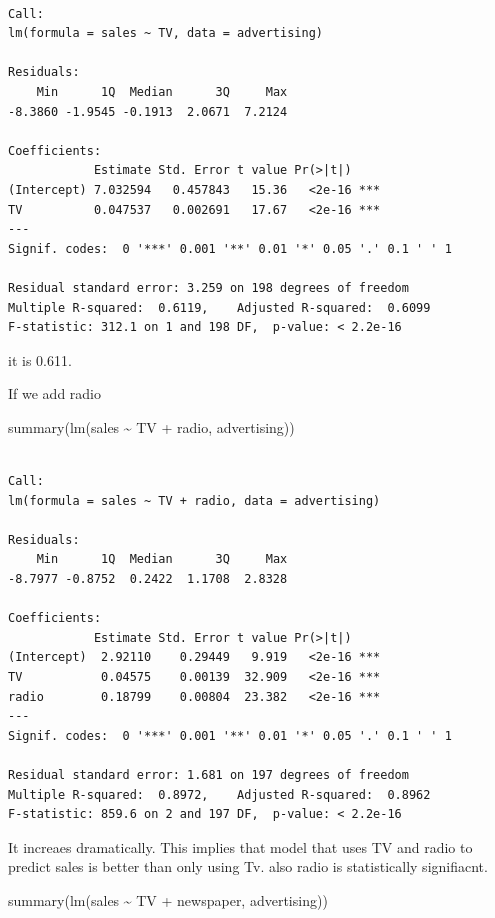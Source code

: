 \documentclass[
  letterpaper,
  DIV=11,
  numbers=noendperiod]{scrreprt}
\newenvironment{Shaded}{\begin{snugshade}}{\end{snugshade}}
\newcommand{\FunctionTok}[1]{\textcolor[rgb]{0.02,0.16,0.49}{#1}}
\newcommand{\NormalTok}[1]{\textcolor[rgb]{0.33,0.33,0.33}{#1}}
\newcommand{\SpecialCharTok}[1]{\textcolor[rgb]{0.00,0.46,0.62}{#1}}
\begin{document}
\begin{verbatim}

Call:
lm(formula = sales ~ TV, data = advertising)

Residuals:
    Min      1Q  Median      3Q     Max 
-8.3860 -1.9545 -0.1913  2.0671  7.2124 

Coefficients:
            Estimate Std. Error t value Pr(>|t|)    
(Intercept) 7.032594   0.457843   15.36   <2e-16 ***
TV          0.047537   0.002691   17.67   <2e-16 ***
---
Signif. codes:  0 '***' 0.001 '**' 0.01 '*' 0.05 '.' 0.1 ' ' 1

Residual standard error: 3.259 on 198 degrees of freedom
Multiple R-squared:  0.6119,    Adjusted R-squared:  0.6099 
F-statistic: 312.1 on 1 and 198 DF,  p-value: < 2.2e-16
\end{verbatim}

it is 0.611.

If we add radio

\begin{Shaded}
\begin{Highlighting}[]
\FunctionTok{summary}\NormalTok{(}\FunctionTok{lm}\NormalTok{(sales }\SpecialCharTok{\textasciitilde{}}\NormalTok{ TV }\SpecialCharTok{+}\NormalTok{ radio, advertising))}
\end{Highlighting}
\end{Shaded}

\begin{verbatim}

Call:
lm(formula = sales ~ TV + radio, data = advertising)

Residuals:
    Min      1Q  Median      3Q     Max 
-8.7977 -0.8752  0.2422  1.1708  2.8328 

Coefficients:
            Estimate Std. Error t value Pr(>|t|)    
(Intercept)  2.92110    0.29449   9.919   <2e-16 ***
TV           0.04575    0.00139  32.909   <2e-16 ***
radio        0.18799    0.00804  23.382   <2e-16 ***
---
Signif. codes:  0 '***' 0.001 '**' 0.01 '*' 0.05 '.' 0.1 ' ' 1

Residual standard error: 1.681 on 197 degrees of freedom
Multiple R-squared:  0.8972,    Adjusted R-squared:  0.8962 
F-statistic: 859.6 on 2 and 197 DF,  p-value: < 2.2e-16
\end{verbatim}

It increaes dramatically. This implies that model that uses TV and radio
to predict sales is better than only using Tv. also radio is
statistically signifiacnt.

\begin{Shaded}
\begin{Highlighting}[]
\FunctionTok{summary}\NormalTok{(}\FunctionTok{lm}\NormalTok{(sales }\SpecialCharTok{\textasciitilde{}}\NormalTok{ TV }\SpecialCharTok{+}\NormalTok{ newspaper, advertising))}
\end{Highlighting}
\end{Shaded}
\end{document}
